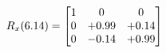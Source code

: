 \documentclass[preview]{standalone}
\begin{document}
\begin{align*}
\special{dvisvgm:raw <g id='unique000'>}R_{x}(6.14) = \begin{bmatrix}1 & 0 & 0 \\0 & +0.99 & +0.14 \\0 & -0.14 & +0.99\end{bmatrix}\special{dvisvgm:raw </g>}
\end{align*}
\end{document}
